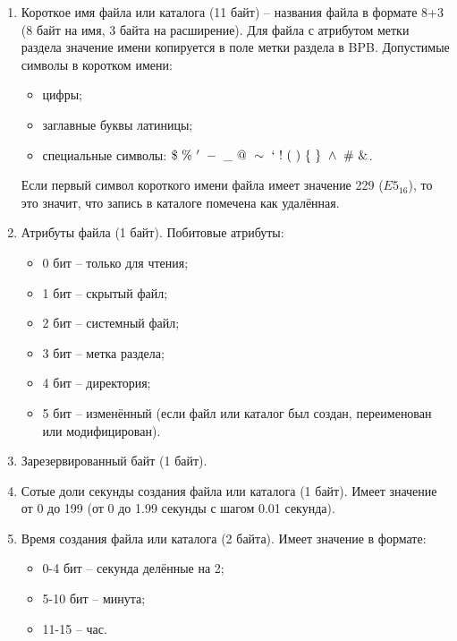 \begin{enumerate}
\item Короткое имя файла или каталога (11 байт) -- названия файла в формате 8+3 (8 байт на имя, 3 байта на расширение). Для файла с атрибутом метки раздела значение имени копируется в поле метки раздела в BPB. Допустимые символы в коротком имени:

	\begin{itemize}
	\item цифры;
	\item заглавные буквы латиницы;
	\item специальные символы: $\$~\%~'~-~\_~@~\sim~`~!~(~)~\{~\}~\wedge~\#~\&$.
	\end{itemize}
	
Если первый символ короткого имени файла имеет значение 229 ($E5_{16}$), то это значит, что запись в каталоге помечена как удалённая.
\item Атрибуты файла (1 байт). Побитовые атрибуты:

	\begin{itemize}
	\item 0 бит -- только для чтения;
	\item 1 бит -- скрытый файл;
	\item 2 бит -- системный файл;
	\item 3 бит -- метка раздела;
	\item 4 бит -- директория;
	\item 5 бит -- изменённый (если файл или каталог был создан, переименован или модифицирован).
	\end{itemize}
	
\item Зарезервированный байт (1 байт).
\item Сотые доли секунды создания файла или каталога (1 байт). Имеет значение от 0 до 199 (от 0 до 1.99 секунды с шагом 0.01 секунда).
\item Время создания файла или каталога (2 байта). Имеет значение в формате:

	\begin{itemize}
	\item 0-4 бит -- секунда делённые на 2;
	\item 5-10 бит -- минута;
	\item 11-15 -- час.
	\end{itemize}
	

\end{enumerate}
